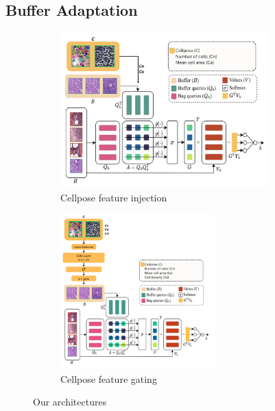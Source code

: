 \documentclass[10pt,twocolumn]{article}
\begin{document}
\subsection{Buffer Adaptation}

\begin{figure}[!htb]
\centering
\begin{subfigure}[b]{0.48\linewidth}
    \includegraphics[width=\linewidth, height=6cm]{images/custom_arch_v1.png}
    \caption{Cellpose feature injection}
    \label{fig:arch_v1}
\end{subfigure}
\hfill
\begin{subfigure}[b]{0.48\linewidth}
    \includegraphics[width=\linewidth, height=6cm]{images/custom_arch_v2.png}
    \caption{Cellpose feature gating}
    \label{fig:arch_v2}
\end{subfigure}
\caption{Our architectures}
\label{custom_buffermil_arc}
\end{figure}
\end{document}
